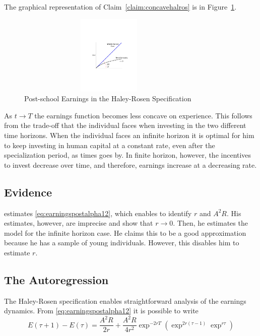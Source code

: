 \indent The graphical representation of Claim~\ref{claim:concavehalros} is in Figure~\ref{fig:halros}. 
\begin{center}
\begin{figure}[H]
\caption{Post-school Earnings in the Haley-Rosen Specification} \label{fig:halros}
\centering
\includegraphics[width=3.5in, height=1.5in]{Figures/fig-finite-horiz.pdf}
\end{figure}
\end{center}

\noindent As $t \rightarrow T$ the earnings function becomes less concave on experience. This follows from the trade-off that the individual faces when investing in the two different time horizons. When the individual faces an infinite horizon it is optimal for him to keep investing in human capital at a constant rate, even after the specialization period, as times goes by. In finite horizon, however, the incentives to invest decrease over time, and therefore, earnings increase at a decreasing rate. 

\subsection{Evidence}
\citet{brown1976model} estimates \eqref{eq:earningspostalpha12}, which enables to identify $r$ and $A^2 R$. His estimates, however, are imprecise and show that $r \rightarrow 0$. Then, he estimates the model for the infinite horizon case. He claims this to be a good approximation because he has a sample of young individuals. However, this disables him to estimate $r$.

\subsection{The Autoregression}
The Haley-Rosen specification enables straightforward analysis of the earnings dynamics. From \eqref{eq:earningspostalpha12} it is possible to write
\begin{equation}
E(\tau + 1) - E(\tau) =  \frac{A^2 R}{2r}+ \frac{A^2 R}{4r^2} \exp^{-2rT} \left( \exp^{2r(\tau - 1)} \exp^{r \tau} \right) 
\end{equation}

